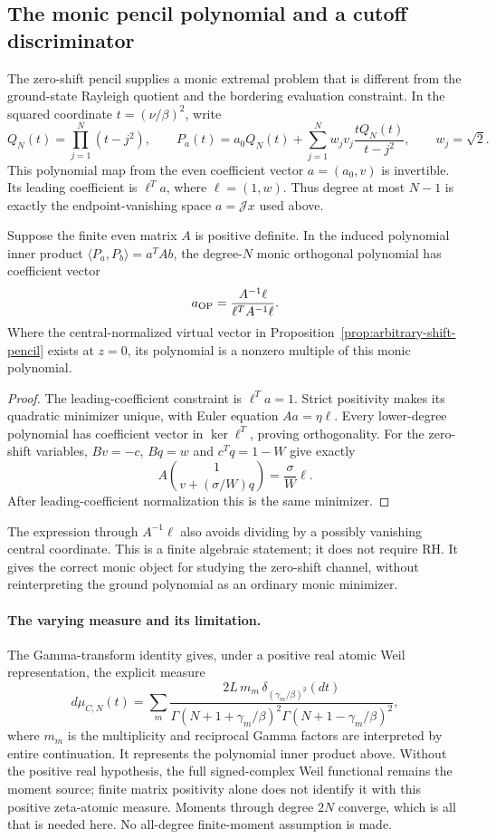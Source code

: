 \subsection{The monic pencil polynomial and a cutoff discriminator}
\label{ssec:monic-pencil-cutoff}

The zero-shift pencil supplies a monic extremal problem that is different
from the ground-state Rayleigh quotient and the bordering evaluation
constraint. In the squared coordinate $t=(\nu/\beta)^2$, write
\[
 Q_N(t)=\prod_{j=1}^N(t-j^2),\qquad
 P_a(t)=a_0Q_N(t)+\sum_{j=1}^Nw_jv_j
                \frac{tQ_N(t)}{t-j^2},\qquad w_j=\sqrt2.
\]
This polynomial map from the even coefficient vector $a=(a_0,v)$ is
invertible. Its leading coefficient is $\ell^Ta$, where $\ell=(1,w)$.
Thus degree at most $N-1$ is exactly the endpoint-vanishing space
$a=\mathcal Jx$ used above.

\begin{proposition}
\label{prop:monic-pencil}
Suppose the finite even matrix $A$ is positive definite. In the induced
polynomial inner product $\langle P_a,P_b\rangle=a^TAb$, the degree-$N$
monic orthogonal polynomial has coefficient vector
\[
 a_{\rm OP}=\frac{A^{-1}\ell}{\ell^TA^{-1}\ell}.
\]
Where the central-normalized virtual vector in
Proposition~\ref{prop:arbitrary-shift-pencil} exists at $z=0$, its
polynomial is a nonzero multiple of this monic polynomial.
\end{proposition}
\begin{proof}
The leading-coefficient constraint is $\ell^Ta=1$.
Strict positivity makes its quadratic minimizer unique, with Euler
equation $Aa=\eta\ell$. Every lower-degree polynomial has coefficient
vector in $\ker\ell^T$, proving orthogonality. For the zero-shift
variables, $Bv=-c$, $Bq=w$ and $c^Tq=1-W$ give exactly
\[
 A\binom{1}{v+(\sigma/W)q}=\frac{\sigma}{W}\ell.
\]
After leading-coefficient normalization this is the same minimizer.
\end{proof}
The expression through $A^{-1}\ell$ also avoids dividing by a possibly
vanishing central coordinate. This is a finite algebraic statement;
it does not require RH. It gives the correct monic object for studying
the zero-shift channel, without reinterpreting the ground polynomial
as an ordinary monic minimizer.

\paragraph{The varying measure and its limitation.}
The Gamma-transform identity gives, under a positive real atomic Weil
representation, the explicit measure
\[
 d\mu_{C,N}(t)=\sum_m
 \frac{2L\,m_m\,\delta_{(\gamma_m/\beta)^2}(dt)}
 {\Gamma(N+1+\gamma_m/\beta)^2
  \Gamma(N+1-\gamma_m/\beta)^2},
\]
where $m_m$ is the multiplicity and reciprocal Gamma factors are
interpreted by entire continuation. It represents the polynomial
inner product above. Without the positive real hypothesis, the full
signed-complex Weil functional remains the moment source; finite
matrix positivity alone does not identify it with this positive
zeta-atomic measure. Moments through degree $2N$ converge, which is
all that is needed here. No all-degree finite-moment assumption is made.

